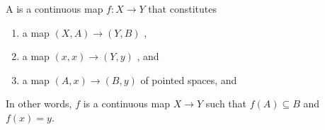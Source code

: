 \begin{definition} \label{definition:morphism_of_pointed_pair_of_topological_spaces}
    A  is a continuous map $f: X \to Y$ that constitutes 
    \begin{enumerate}
        \item a map $(X,A) \to (Y,B)$ ,
        \item a map $(x,x) \to (Y,y)$ , and
        \item a map $(A,x) \to (B,y)$ of pointed spaces, and
    \end{enumerate}
    In other words, $f$ is a continuous map $X \to Y$ such that $f(A) \subseteq B$ and $f(x) = y$. 
\end{definition}